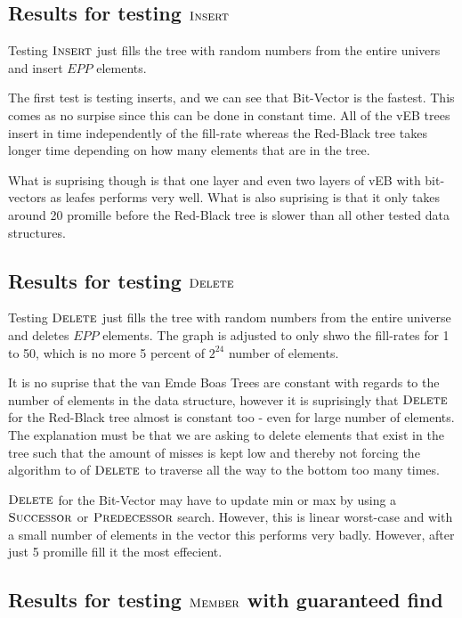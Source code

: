\documentclass[oneside,11pt,openright]{report}
\newcommand{\Insert}{\textsc{Insert}}
\newcommand{\Delete}{\textsc{Delete}}
\newcommand{\Member}{\textsc{Member}}
\newcommand{\Predecessor}{\textsc{Predecessor}}
\newcommand{\Successor}{\textsc{Successor}}
\begin{document}
\subsection{Results for testing $\Insert$}

Testing $\Insert$ just fills the tree with random numbers from the entire univers and insert $EPP$ elements.



The first test is testing inserts, and we can see that Bit-Vector is the fastest. This comes as no surpise since this can be done in constant time. All of the vEB trees insert in time independently of the fill-rate whereas the Red-Black tree takes longer time depending on how many elements that are in the tree.

What is suprising though is that one layer and even two layers of vEB with bit-vectors as leafes performs very well. What is also suprising is that it only takes around 20 promille before the Red-Black tree is slower than all other tested data structures.

\subsection{Results for testing $\Delete$}

Testing $\Delete$ just fills the tree with random numbers from the entire universe and deletes $EPP$ elements. The graph is adjusted to only shwo the fill-rates for 1 to 50, which is no more 5 percent of $2^{24}$ number of elements.



It is no suprise that the van Emde Boas Trees are constant with regards to the number of elements in the data structure, however it is suprisingly that $\Delete$ for the Red-Black tree almost is constant too - even for large number of elements. The explanation must be that we are asking to delete elements that exist in the tree such that the amount of misses is kept low and thereby not forcing the algorithm to of $\Delete$ to traverse all the way to the bottom too many times.

$\Delete$ for the Bit-Vector may have to update min or max by using a $\Successor$ or $\Predecessor$ search. However, this is linear worst-case and with a small number of elements in the vector this performs very badly. However, after just 5 promille fill it the most effecient. 

\subsection{Results for testing $\Member$ with guaranteed find}
\end{document}
